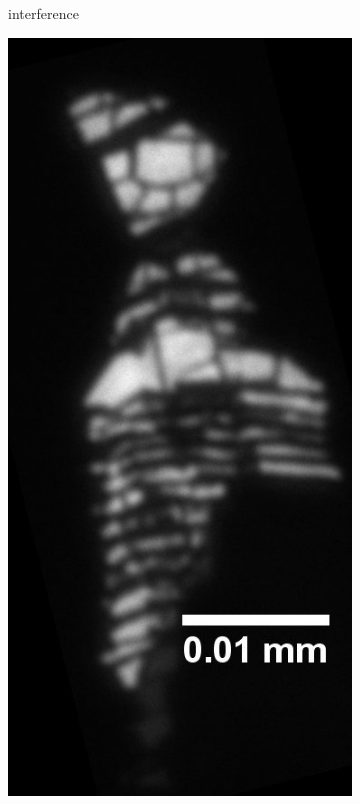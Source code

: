 \begin{figure}[H]
\begin{subfigure}{0.3\textwidth}
        \caption{interference}
	      \label{fig_mono_spec1_int}
    \end{subfigure}
    \begin{subfigure}{0.24\textwidth}
        \centering
        \includegraphics[width=\textwidth]{img/output_t1/M1_3_50_adj_photo}

\end{subfigure}
\end{figure}
